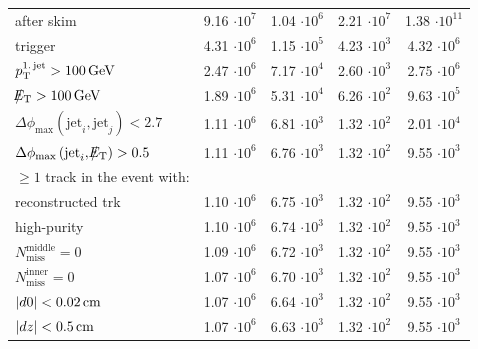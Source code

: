 \begin{table}[!h]
{\begin{tabular}{|l|c|c|c|c|}
after skim                                                                                & 9.16 $\cdot10^{7 }$ & 1.04 $\cdot10^{6 }$ & 2.21 $\cdot10^{7 }$ & 1.38 $\cdot10^{11}$ \\
trigger                                                                                   & 4.31 $\cdot10^{6 }$ & 1.15 $\cdot10^{5 }$ & 4.23 $\cdot10^{3 }$ & 4.32 $\cdot10^{6 }$ \\
$p_{\text{T}}^{\text{1.\,jet}}>100\,\text{Ge}\kern-0.06667em\text{V}$                                                                     & 2.47 $\cdot10^{6 }$ & 7.17 $\cdot10^{4 }$ & 2.60 $\cdot10^{3 }$ & 2.75 $\cdot10^{6 }$ \\
$\slash\mkern-12mu{E}_{\text{T}}>100\,\text{Ge}\kern-0.06667em\text{V}$                                                                            & 1.89 $\cdot10^{6 }$ & 5.31 $\cdot10^{4 }$ & 6.26 $\cdot10^{2 }$ & 9.63 $\cdot10^{5 }$ \\
$\Delta\phi_{\text{max}} \left( \text{jet}_i, \text{jet}_j  \right)<2.7$                  & 1.11 $\cdot10^{6 }$ & 6.81 $\cdot10^{3 }$ & 1.32 $\cdot10^{2 }$ & 2.01 $\cdot10^{4 }$ \\
$\Delta\phi_{\text{max}} \left( \text{jet}_i, \slash\mkern-12mu{E}_{\text{T}}  \right)>0.5$                          & 1.11 $\cdot10^{6 }$ & 6.76 $\cdot10^{3 }$ & 1.32 $\cdot10^{2 }$ & 9.55 $\cdot10^{3 }$ \\
$\geq1$ track in the event with:                                                          &&&&\\
reconstructed trk                                                                         & 1.10 $\cdot10^{6 }$ & 6.75 $\cdot10^{3 }$ & 1.32 $\cdot10^{2 }$ & 9.55 $\cdot10^{3 }$ \\
high-purity                                                                               & 1.10 $\cdot10^{6 }$ & 6.74 $\cdot10^{3 }$ & 1.32 $\cdot10^{2 }$ & 9.55 $\cdot10^{3 }$ \\
$N_{\text{miss}}^{\text{middle}}=0$                                                       & 1.09 $\cdot10^{6 }$ & 6.72 $\cdot10^{3 }$ & 1.32 $\cdot10^{2 }$ & 9.55 $\cdot10^{3 }$ \\
$N_{\text{miss}}^{\text{inner}}=0$                                                        & 1.07 $\cdot10^{6 }$ & 6.70 $\cdot10^{3 }$ & 1.32 $\cdot10^{2 }$ & 9.55 $\cdot10^{3 }$ \\
$|d0|<0.02\,\text{cm}$                                                                            & 1.07 $\cdot10^{6 }$ & 6.64 $\cdot10^{3 }$ & 1.32 $\cdot10^{2 }$ & 9.55 $\cdot10^{3 }$ \\
$|dz|<0.5\,\text{cm}$                                                                             & 1.07 $\cdot10^{6 }$ & 6.63 $\cdot10^{3 }$ & 1.32 $\cdot10^{2 }$ & 9.55 $\cdot10^{3 }$ \\

\end{tabular}}
\end{table}

